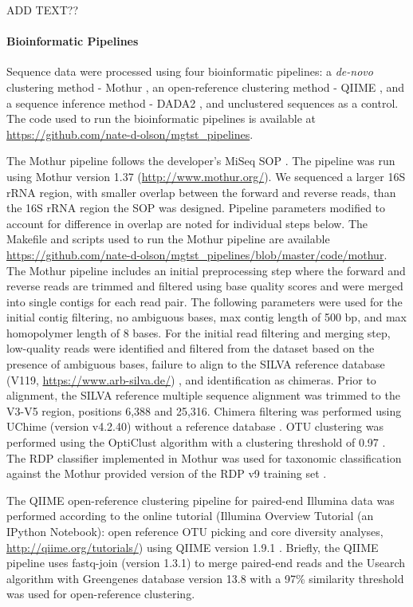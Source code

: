 \documentclass[linenumbers]{bmcart}
\begin{document}
ADD TEXT??

\paragraph*{Bioinformatic Pipelines}

Sequence data were processed using four bioinformatic pipelines: a
\emph{de-novo} clustering method - Mothur
\cite{schloss2009introducing}, an open-reference clustering method -
QIIME \cite{Caporaso2010}, and a sequence inference method - DADA2
\cite{callahan2016dada2}, and unclustered sequences as a control. The
code used to run the bioinformatic pipelines is available at
\url{https://github.com/nate-d-olson/mgtst_pipelines}.

The Mothur pipeline follows the developer's MiSeq SOP
\cite{schloss2009introducing, kozich2013development}. The pipeline was
run using Mothur version 1.37 (\url{http://www.mothur.org/}). We
sequenced a larger 16S rRNA region, with smaller overlap between the
forward and reverse reads, than the 16S rRNA region the SOP was
designed. Pipeline parameters modified to account for difference in
overlap are noted for individual steps below. The Makefile and scripts
used to run the Mothur pipeline are available
\url{https://github.com/nate-d-olson/mgtst_pipelines/blob/master/code/mothur}.
The Mothur pipeline includes an initial preprocessing step where the
forward and reverse reads are trimmed and filtered using base quality
scores and were merged into single contigs for each read pair. The
following parameters were used for the initial contig filtering, no
ambiguous bases, max contig length of 500 bp, and max homopolymer length
of 8 bases. For the initial read filtering and merging step, low-quality
reads were identified and filtered from the dataset based on the
presence of ambiguous bases, failure to align to the SILVA reference
database (V119, \url{https://www.arb-silva.de/}) \cite{quast2012silva},
and identification as chimeras. Prior to alignment, the SILVA reference
multiple sequence alignment was trimmed to the V3-V5 region, positions
6,388 and 25,316. Chimera filtering was performed using UChime (version
v4.2.40) without a reference database \cite{edgar2011uchime}. OTU
clustering was performed using the OptiClust algorithm with a clustering
threshold of 0.97 \cite{westcott2017opticlust}. The RDP classifier
implemented in Mothur was used for taxonomic classification against the
Mothur provided version of the RDP v9 training set
\cite{wang2007naive}.

The QIIME open-reference clustering pipeline for paired-end Illumina
data was performed according to the online tutorial (Illumina Overview
Tutorial (an IPython Notebook): open reference OTU picking and core
diversity analyses, \url{http://qiime.org/tutorials/}) using QIIME
version 1.9.1 \cite{Caporaso2010}. Briefly, the QIIME pipeline uses
fastq-join (version 1.3.1) to merge paired-end reads
\cite{aronesty2011ea} and the Usearch algorithm \cite{edgar2010search}
with Greengenes database version 13.8 with a 97\% similarity threshold
\cite{desantis2006greengenes} was used for open-reference clustering.
\end{document}
